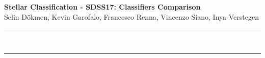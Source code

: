 \documentclass[a4paper,12pt]{article}
\renewenvironment{abstract}
 {\par\noindent\textbf{\abstractname}\ \ignorespaces \\}
 {\par\noindent\medskip}
\begin{document}
\pagestyle{fancy}
\thispagestyle{empty}
\fancyhead[L]{}
\renewcommand*{\thefootnote}{\fnsymbol{footnote}}
\begin{center}
\Large{\textbf{Stellar Classification - SDSS17: Classifiers Comparison}}
\vspace{0.5cm}
\normalsize
\\ Selin Dökmen, Kevin Garofalo, Francesco Renna, Vincenzo Siano, Inya Verstegen \\
\vspace{0.5cm}
\medskip
\normalsize
\end{center}
{\color{gray}\hrule}
\vspace{0.3cm}
\begin{abstract}

\end{abstract}
{\color{gray}\hrule}
\medskip
\begin{multicols}{2}






%
%
\printbibliography
\end{multicols}
\end{document}
